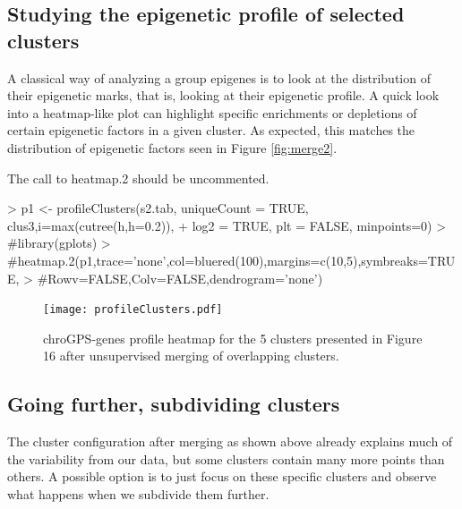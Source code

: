 \documentclass[a4paper,12pt,nogin]{article}
\newcommand{\newtext}[1]{{\color{blue} #1}} %
\newcommand{\drcomment}[1]{{\color{red} #1}} %
\begin{document}
\subsection{Studying the epigenetic profile of selected clusters}
\label{sec:profileGPS}

A classical way of analyzing a group epigenes is to look at the
distribution of their epigenetic marks, that is, looking at their
epigenetic profile. A quick look into a heatmap-like plot can
highlight specific enrichments or depletions of certain epigenetic
factors in a given cluster. As expected, this matches the 
distribution of epigenetic factors \newtext{seen in Figure \ref{fig:merge2}.}

\drcomment{The call to heatmap.2 should be uncommented.}

\footnotesize

\begin{Schunk}
\begin{Sinput}
> p1 <- profileClusters(s2.tab, uniqueCount = TRUE, clus3,i=max(cutree(h,h=0.2)), 
+ log2 = TRUE, plt = FALSE, minpoints=0)
> #library(gplots)
> #heatmap.2(p1,trace='none',col=bluered(100),margins=c(10,5),symbreaks=TRUE,
> #Rowv=FALSE,Colv=FALSE,dendrogram='none')
\end{Sinput}
\end{Schunk}

\normalsize

\begin{figure}
\begin{center}
{\texttt{[image: profileClusters.pdf]}}
\end{center}
\caption{chroGPS-genes profile heatmap for the 5 clusters presented
  in Figure 16 after unsupervised merging of overlapping clusters.}
\label{fig:profile1}
\end{figure}

\normalsize

\subsection{Going further, subdividing clusters}
\label{sec:clusGPS4}

The cluster configuration after merging as shown above already explains much of the variability from our data, but 
\newtext{some clusters contain many more points than others.}
A possible option is to just focus on these specific clusters and observe what happens when we subdivide them further.
\end{document}
